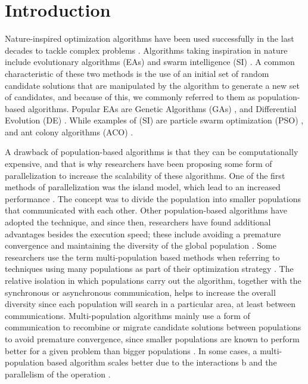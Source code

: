 \section{Introduction}

Nature-inspired optimization algorithms have been used successfully in the last
decades to tackle complex problems \cite{yang2014nature}. Algorithms taking
inspiration in nature include evolutionary algorithms (EAs)
\cite{back1996evolutionary} and swarm intelligence (SI)
\cite{kennedy2006swarm}. A common characteristic of these two methods is the
use of an initial set of random candidate solutions that are manipulated by the
algorithm to generate a new set of candidates, and because of this, we commonly
referred to them as population-based algorithms. Popular EAs are Genetic
Algorithms (GAs) \cite{holland1992adaptation,eiben2003genetic}, and
Differential Evolution (DE) \cite{karabouga2004simple}. While examples of (SI)
\cite{kennedy2006swarm} are particle swarm optimization (PSO)
\cite{clerc2010particle}, and ant colony algorithms (ACO) \cite{dorigo1999ant}.

A drawback of population-based algorithms is that they can be computationally
expensive, and that is why researchers have been proposing some form of
parallelization \cite{muhlenbein1988evolution} to increase the scalability of
these algorithms. One of the first methods of parallelization was the island
model, which lead to an increased performance
\cite{gorges1990explicit,grosso1985computer}. The concept was to divide the
population into smaller populations that communicated with each other. Other
population-based algorithms have adopted the technique, and since then,
researchers have found additional advantages besides the execution speed; these
include avoiding a premature convergence and maintaining the diversity of the
global population \cite{li2015multi}. Some researchers use the term
multi-population based methods when referring to techniques using many
populations as part of their optimization strategy \cite{Ma2019}. The relative
isolation in which populations carry out the algorithm, together with the
synchronous or asynchronous communication, helps to increase the overall
diversity since each population will search in a particular area, at least
between communications. Multi-population algorithms mainly use a form of
communication to recombine or migrate candidate solutions between populations
to avoid premature convergence, since smaller populations are known to perform
better for a given problem than bigger populations
\cite{li2016multi,wu2016differential}. In some cases, a multi-population based
algorithm scales better due to the interactions b and the parallelism of the
operation \cite{ALBA20027}.

